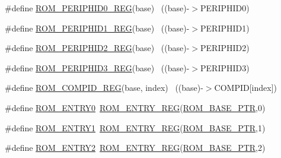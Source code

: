 \begin{DoxyCompactItemize}
\#define \hyperlink{group___r_o_m___register___accessor___macros_gab7954217027d7a738dcb0043b21c7c88}{R\+O\+M\+\_\+\+P\+E\+R\+I\+P\+H\+I\+D0\+\_\+\+R\+EG}(base)                                ~((base)-\/$>$P\+E\+R\+I\+P\+H\+I\+D0)
\item 
\#define \hyperlink{group___r_o_m___register___accessor___macros_gaf4bae6e0e9b6a84e0b35e3cc47ceb932}{R\+O\+M\+\_\+\+P\+E\+R\+I\+P\+H\+I\+D1\+\_\+\+R\+EG}(base)                                ~((base)-\/$>$P\+E\+R\+I\+P\+H\+I\+D1)
\item 
\#define \hyperlink{group___r_o_m___register___accessor___macros_ga1e29fa2f23582f8b1d84d500955d3430}{R\+O\+M\+\_\+\+P\+E\+R\+I\+P\+H\+I\+D2\+\_\+\+R\+EG}(base)                                ~((base)-\/$>$P\+E\+R\+I\+P\+H\+I\+D2)
\item 
\#define \hyperlink{group___r_o_m___register___accessor___macros_ga69bf49b73f7571be987344826b1586a2}{R\+O\+M\+\_\+\+P\+E\+R\+I\+P\+H\+I\+D3\+\_\+\+R\+EG}(base)                                ~((base)-\/$>$P\+E\+R\+I\+P\+H\+I\+D3)
\item 
\#define \hyperlink{group___r_o_m___register___accessor___macros_ga6c627260c5decb61186ddcb1ebef66b5}{R\+O\+M\+\_\+\+C\+O\+M\+P\+I\+D\+\_\+\+R\+EG}(base,  index)                          ~((base)-\/$>$C\+O\+M\+P\+ID\mbox{[}index\mbox{]})
\item 
\#define \hyperlink{group___r_o_m___register___accessor___macros_gada69a41d0a902f6012e684efb7c9e3ad}{R\+O\+M\+\_\+\+E\+N\+T\+R\+Y0}~\hyperlink{group___r_o_m___register___accessor___macros_gaa621177d86d2cbf2946deff1d6b18d97}{R\+O\+M\+\_\+\+E\+N\+T\+R\+Y\+\_\+\+R\+EG}(\hyperlink{group___r_o_m___peripheral_ga5ad426d10b6832ca7012e8767113f686}{R\+O\+M\+\_\+\+B\+A\+S\+E\+\_\+\+P\+TR},0)
\item 
\#define \hyperlink{group___r_o_m___register___accessor___macros_gac1064716d92d1384ff4b0bf063baabe6}{R\+O\+M\+\_\+\+E\+N\+T\+R\+Y1}~\hyperlink{group___r_o_m___register___accessor___macros_gaa621177d86d2cbf2946deff1d6b18d97}{R\+O\+M\+\_\+\+E\+N\+T\+R\+Y\+\_\+\+R\+EG}(\hyperlink{group___r_o_m___peripheral_ga5ad426d10b6832ca7012e8767113f686}{R\+O\+M\+\_\+\+B\+A\+S\+E\+\_\+\+P\+TR},1)
\item 
\#define \hyperlink{group___r_o_m___register___accessor___macros_ga0ae5079cc5e456ff696440862af66421}{R\+O\+M\+\_\+\+E\+N\+T\+R\+Y2}~\hyperlink{group___r_o_m___register___accessor___macros_gaa621177d86d2cbf2946deff1d6b18d97}{R\+O\+M\+\_\+\+E\+N\+T\+R\+Y\+\_\+\+R\+EG}(\hyperlink{group___r_o_m___peripheral_ga5ad426d10b6832ca7012e8767113f686}{R\+O\+M\+\_\+\+B\+A\+S\+E\+\_\+\+P\+TR},2)

\end{DoxyCompactItemize}
